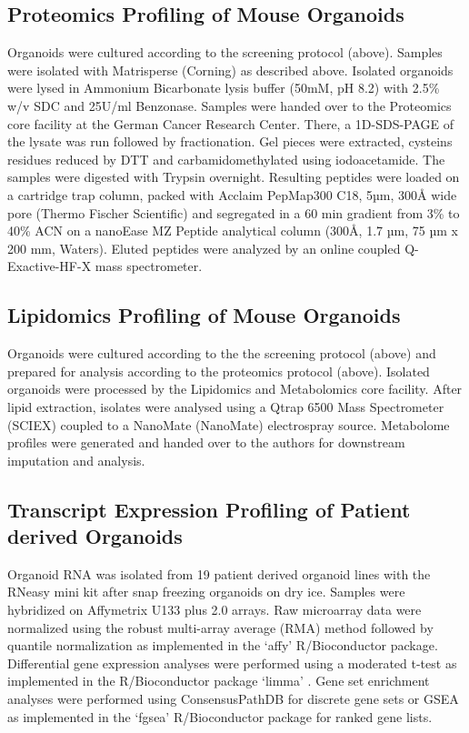 \begin{flushleft}
\subsection{Proteomics Profiling of Mouse Organoids}
Organoids were cultured according to the screening protocol (above). Samples were isolated with Matrisperse (Corning) as described above. Isolated organoids were lysed in Ammonium Bicarbonate lysis buffer (50mM, pH 8.2) with 2.5\% w/v SDC and 25U/ml Benzonase. 
Samples were handed over to the Proteomics core facility at the German Cancer Research Center. There, a 1D-SDS-PAGE of the lysate was run followed by fractionation. Gel pieces were extracted, cysteins residues reduced by DTT and carbamidomethylated using iodoacetamide. The samples were digested with Trypsin overnight.
Resulting peptides were loaded on a cartridge trap column, packed with Acclaim PepMap300 C18, 5µm, 300Å wide pore (Thermo Fischer Scientific) and segregated in a 60 min gradient from 3\% to 40\% ACN on a nanoEase MZ Peptide analytical column (300Å, 1.7 µm, 75 µm x 200 mm, Waters). Eluted peptides were analyzed by an online coupled Q-Exactive-HF-X mass spectrometer.

\subsection{Lipidomics Profiling of Mouse Organoids}
Organoids were cultured according to the the screening protocol (above) and prepared for analysis according to the proteomics protocol (above). 
Isolated organoids were processed by the Lipidomics and Metabolomics core facility. 
After lipid extraction, isolates were analysed using a Qtrap 6500 Mass Spectrometer (SCIEX) coupled to a NanoMate (NanoMate) electrospray source. Metabolome profiles were generated and handed over to the authors for downstream imputation and analysis.

\subsection{Transcript Expression Profiling of Patient derived Organoids}
Organoid RNA was isolated from 19 patient derived organoid lines with the RNeasy mini kit after snap freezing organoids on dry ice. Samples were hybridized on Affymetrix U133 plus 2.0 arrays. Raw microarray data were normalized using the robust multi-array average (RMA) method \parencite{irizarryExplorationNormalizationSummaries2003} followed by quantile normalization as implemented in the ‘affy’ \parencite{gautierAffyAnalysisAffymetrix2004} R/Bioconductor \parencite{huberOrchestratingHighthroughputGenomic2015} package. Differential gene expression analyses were performed using a moderated t-test as implemented in the R/Bioconductor package ‘limma’ \parencite{ritchieLimmaPowersDifferential2015}. Gene set enrichment analyses were performed using ConsensusPathDB \parencite{kamburovConsensusPathDBMoreComplete2011} for discrete gene sets or GSEA as implemented in the ‘fgsea’ R/Bioconductor package for ranked gene lists.


\end{flushleft}
